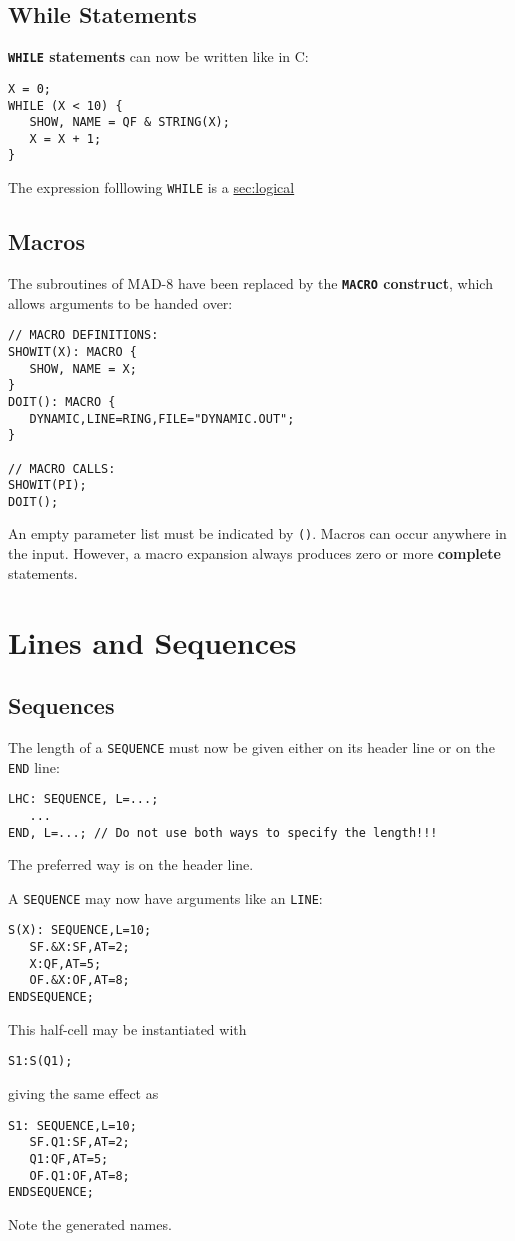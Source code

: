 \documentclass{article}
\newcommand{\secref}[2]{\hyperref{#1}{#1 (see Section~}{)}{sec:#2}}
\begin{document}
\subsection{While Statements}
\textbf{\texttt{WHILE} statements} can now be written like in C:
\begin{verbatim}
X = 0;
WHILE (X < 10) {
   SHOW, NAME = QF & STRING(X);
   X = X + 1;
}
\end{verbatim}
The expression folllowing \texttt{WHILE} is a 
\secref{\texttt{<logical expression>}}{logical}

\subsection{Macros}
The subroutines of MAD-8 have been replaced by the \textbf{\texttt{MACRO} 
construct}, which allows arguments to be handed over:
\begin{verbatim}
// MACRO DEFINITIONS:
SHOWIT(X): MACRO {
   SHOW, NAME = X;
}
DOIT(): MACRO {
   DYNAMIC,LINE=RING,FILE="DYNAMIC.OUT";
}

// MACRO CALLS:
SHOWIT(PI);
DOIT();
\end{verbatim}
An empty parameter list must be indicated by \texttt{()}.
Macros can occur anywhere in the input.
However, a macro expansion always produces zero or more \textbf{complete}
statements.

\section{Lines and Sequences}

\subsection{Sequences}
The length of a \texttt{SEQUENCE} must now be given either on its 
header line or on the \texttt{END} line:
\begin{verbatim}
LHC: SEQUENCE, L=...;
   ...
END, L=...; // Do not use both ways to specify the length!!!
\end{verbatim}
The preferred way is on the header line.

A \texttt{SEQUENCE} may now have arguments like an \texttt{LINE}:
\begin{verbatim}
S(X): SEQUENCE,L=10;
   SF.&X:SF,AT=2;
   X:QF,AT=5;
   OF.&X:OF,AT=8;
ENDSEQUENCE;
\end{verbatim}
This half-cell may be instantiated with
\begin{verbatim}
S1:S(Q1);
\end{verbatim}
giving the same effect as
\begin{verbatim}
S1: SEQUENCE,L=10;
   SF.Q1:SF,AT=2;
   Q1:QF,AT=5;
   OF.Q1:OF,AT=8;
ENDSEQUENCE;
\end{verbatim}
Note the generated names.
\end{document}
